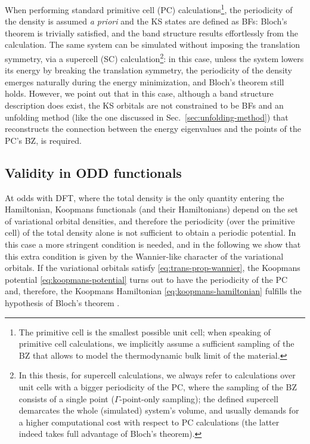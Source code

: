 When performing standard primitive cell (PC) calculations\footnote{The primitive cell is the smallest possible unit cell; when speaking of primitive cell calculations, we implicitly assume a sufficient sampling of the BZ that allows to model the thermodynamic bulk limit of the material.}, the periodicity of the density is assumed \emph{a priori} and the KS states are defined as BFs: Bloch's theorem is trivially satisfied, and the band structure results effortlessly from the calculation. The same system can be simulated without imposing the translation symmetry, via a supercell (SC) calculation\footnote{In this thesis, for supercell calculations, we always refer to calculations over unit cells with a bigger periodicity of the PC, where the sampling of the BZ consists of a single point ($\Gamma$-point-only sampling); the defined supercell demarcates the whole (simulated) system's volume, and usually demands for a higher computational cost with respect to PC calculations (the latter indeed takes full advantage of Bloch's theorem).}: in this case, unless the system lowers its energy by breaking the translation symmetry, the periodicity of the density emerges naturally during the energy minimization, and Bloch's theorem still holds. However, we point out that in this case, although a band structure description does exist, the KS orbitals are not constrained to be BFs and an unfolding method (like the one discussed in Sec.~\ref{sec:unfolding-method}) that reconstructs the connection between the energy eigenvalues and the points of the PC's BZ, is required.

\subsection{Validity in ODD functionals\label{sec:bloch-th-odd}}
At odds with DFT, where the total density is the only quantity entering the Hamiltonian, Koopmans functionals (and their Hamiltonians) depend on the set of variational orbital densities, and therefore the periodicity (over the primitive cell) of the total density alone is not sufficient to obtain a periodic potential. In this case a more stringent condition is needed, and in the following we show that this extra condition is given by the Wannier-like character of the variational orbitals. If the variational orbitals satisfy \cref{eq:trans-prop-wannier}, the Koopmans potential \eqref{eq:koopmans-potential} turns out to have the periodicity of the PC and, therefore, the Koopmans Hamiltonian \eqref{eq:koopmans-hamiltonian} fulfills the hypothesis of Bloch's theorem \cite{de_gennaro_blochs_2022}.

